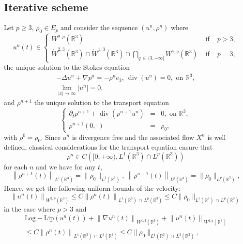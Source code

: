 \documentclass[10pt]{amsart}
\theoremstyle{definition}\newtheorem{defi}[theo]{Definition}\newtheorem{rema}[theo]{Remark}\newtheorem{exam}[theo]{Example}\newtheorem{exem}[theo]{Example}\newtheorem{nota}[theo]{Notation}
\newcommand{\LLip}{\mathrm{Log-Lip}}
\newcommand{\R}{\mathbb{R}}
\renewcommand{\leq}{\leqslant}
\renewcommand{\geq}{\geqslant}
\renewcommand{\div}{\operatorname{div}}
\begin{document}
\subsection{Iterative scheme} Let $p\geq 3$, $\rho_0 \in E_p$ and consider the sequence $(u^n,\rho^n)$ where
\[
u^n(t) \in
\left\{
\begin{array}{lcl}
W^{2,p}\left(\R^3\right) & \text{ if } & p>3,\\
\dot{W}^{2,3}\left(\R^3\right)\cap \dot{W}^{1,3}\left(\R^3\right) \cap \underset{q\,\in\,(3,+\infty]}{\bigcap} W^{1,q}\left(\R^3\right) & \text{ if } & p=3,
\end{array}
\right.
\]
the unique solution to the Stokes equation
\begin{equation*}
\begin{array}{c}
-\Delta u^n+ \nabla p^n= - \rho^n e_3, \:\div(u^n)=0, \text{ on } \R^3,\\
\underset{|x|\to \infty}{\lim} |u^n| = 0,
\end{array}
\end{equation*}
and $\rho^{n+1}$ the unique solution to the transport equation
\begin{equation*}
\left\{
\begin{array}{rcl}
\partial_t \rho^{n+1}+\div\left(\rho^{n+1} u^n\right)&=& 0, \text{ on } \R^3,\\
\rho^{n+1}(0,\cdot)&=& \rho_0,
\end{array}\right.
\end{equation*}
with $\rho^0=\rho_0$. Since $u^n$ is divergence free and the associated flow $X^n$ is well defined, classical considerations for the transport equation ensure that
\[
\rho^n \in C\left([0,+\infty), L^1\left(\R^3\right)\cap L^p\left(\R^3\right)\right)
\]
for each $n$ and we have for any $t$,
\begin{equation}\label{borne_rho_n}
\left\|\rho^{n+1}(t)\right\|_{L^1\left(\R^3\right)}=\|\rho_0\|_{L^1\left(\R^3\right)}, \: \left\|\rho^{n+1}(t)\right\|_{L^p\left(\R^3\right)}=\|\rho_0\|_{L^p\left(\R^3\right)},
\end{equation}
Hence, we get the following uniform bounds of the velocity:
\begin{equation}\label{borne_u^n}
\left\|u^n(t)\right\|_{W^{2,p}\left(\R^3\right)}\leq C \left\|\rho^n(t)\right\|_{L^1\left(\R^3\right)\,\cap \,L^p\left(\R^3\right)} \leq C \| \rho_0\|_{L^1\left(\R^3\right)\,\cap \,L^p\left(\R^3\right)}
\end{equation}
in the case where $p>3$ and
\begin{multline}\label{borne_u^n_bis}
\LLip(u^n(t))+ \left\|\nabla u^n(t)\right\|_{W^{1,3}\left(\R^3\right)}+ \left\| u^n(t)\right\|_{W^{1,q}\left(\R^3\right)}\\
\leq C \left\|\rho^n(t)\right\|_{L^1\left(\R^3\right)\,\cap\,L^3\left(\R^3\right)} \leq C \| \rho_0\|_{L^1\left(\R^3\right)\,\cap \,L^3\left(\R^3\right)},
\end{multline}
\end{document}
